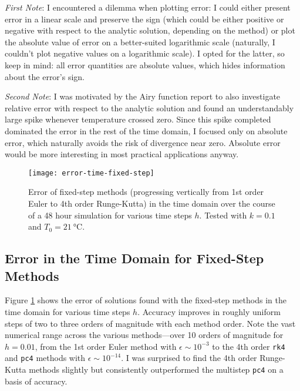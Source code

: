 \documentclass[11pt, a4paper]{article}
\begin{document}
\textit{First Note}: I encountered a dilemma when plotting error: I could either present error in a linear scale and preserve the sign (which could be either positive or negative with respect to the analytic solution, depending on the method) or plot the absolute value of error on a better-suited logarithmic scale (naturally, I couldn't plot negative values on a logarithmic scale). I opted for the latter, so keep in mind: all error quantities are absolute values, which hides information about the error's sign.

\vspace{2mm}
\textit{Second Note}:  I was motivated by the Airy function report to also investigate relative error with respect to the analytic solution and found an understandably large spike whenever temperature crossed zero. Since this spike completed dominated the error in the rest of the time domain, I focused only on absolute error, which naturally avoids the risk of divergence near zero. Absolute error would be more interesting in most practical applications anyway.


\begin{figure}[htb!]
\centering
\texttt{[image: error-time-fixed-step]}

\caption{Error of fixed-step methods (progressing vertically from 1st order Euler to 4th order Runge-Kutta) in the time domain over the course of a 48 hour simulation for various time steps $ h $. Tested with $ k = 0.1 $ and $ T_{0} = \SI{21}{\degreeCelsius} $.} 

\label{ivp:fig:error-time-fixed-step}

\end{figure} 


\subsection{Error in the Time Domain for Fixed-Step Methods}
Figure \ref{ivp:fig:error-time-fixed-step} shows the error of solutions found with the fixed-step methods in the time domain for various time steps $ h $. Accuracy improves in roughly uniform steps of two to three orders of magnitude with each method order. Note the vast numerical range across the various methods---over 10 orders of magnitude for $ h = 0.01 $, from the 1st order Euler method with $ \epsilon \sim 10^{-3} $ to the 4th order \texttt{rk4} and \texttt{pc4} methods with $ \epsilon \sim 10^{-14} $. I was surprised to find the 4th order Runge-Kutta methods slightly but consistently outperformed the multistep \texttt{pc4} on a basis of accuracy.
\end{document}
